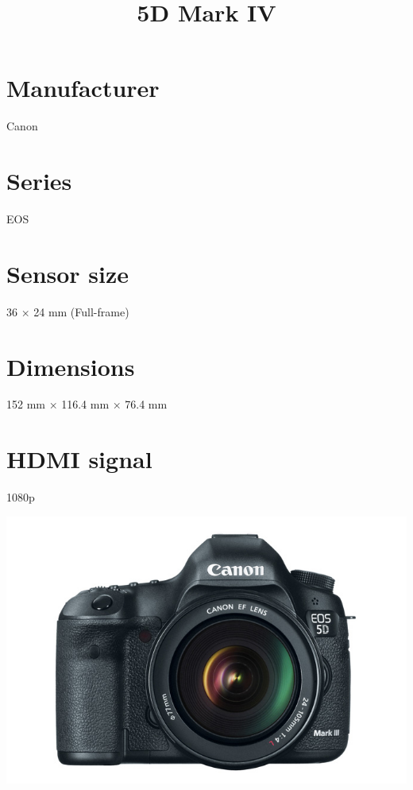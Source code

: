 \documentclass{article}
\begin{document}
\usepackage{titlesec}
\usepackage{graphicx}


\title{5D Mark IV}
\section{Manufacturer}
Canon
\section{Series}
EOS
\section{Sensor size}
36 × 24 mm (Full-frame)
\section{Dimensions}
152 mm × 116.4 mm × 76.4 mm
\section{HDMI signal}
1080p


\includegraphics[width=\textwidth]{5d-mark-III.jpg}
\end{document}

